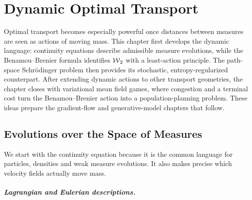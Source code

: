 
\chapter{Dynamic Optimal Transport}
\label{sec-dynamic-optimal-transport}

Optimal transport becomes especially powerful once distances between measures are seen as actions of moving mass. This chapter first develops the dynamic language: continuity equations describe admissible measure evolutions, while the Benamou--Brenier formula identifies $\operatorname{\mathcal{W}}_2$ with a least-action principle. The path-space Schr\"odinger problem then provides its stochastic, entropy-regularized counterpart. After extending dynamic actions to other transport geometries, the chapter closes with variational mean field games, where congestion and a terminal cost turn the Benamou--Brenier action into a population-planning problem. These ideas prepare the gradient-flow and generative-model chapters that follow.

\section{Evolutions over the Space of Measures}\label{sec-measure-evolutions}

We start with the continuity equation because it is the common language for particles, densities and weak measure evolutions. It also makes precise which velocity fields actually move mass.

\paragraph{Lagrangian and Eulerian descriptions.}

